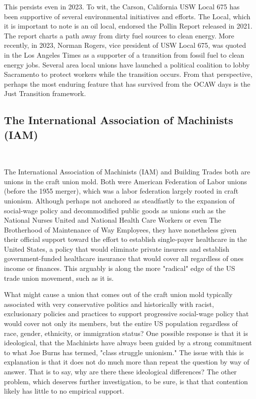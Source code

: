 \documentclass[12pt]{article}
\begin{document}
This persists even in 2023. To wit, the Carson, California USW Local 675 has been supportive of several environmental initiatives and efforts. The Local, which it is important to note is an oil local, endorsed the Pollin Report released in 2021. The report charts a path away from dirty fuel sources to clean energy. More recently, in 2023, Norman Rogers, vice president of USW Local 675, was quoted in the Los Angeles Times as a supporter of a transition from fossil fuel to clean energy jobs. Several area local unions have launched a political coalition to lobby Sacramento to protect workers while the transition occurs. From that perspective, perhaps the most enduring feature that has survived from the OCAW days is the Just Transition framework.

\subsection{The International Association of Machinists (IAM)} \

The International Association of Machinists (IAM) and Building Trades both are unions in the craft union mold. Both were American Federation of Labor unions (before the 1955 merger), which was a labor federation largely rooted in craft unionism. Although perhaps not anchored as steadfastly to the expansion of social-wage policy and decommodified public goods as unions such as the National Nurses United and National Health Care Workers or even The Brotherhood of Maintenance of Way Employees, they have nonetheless given their official support toward the effort to establish single-payer healthcare in the United States, a policy that would eliminate private insurers and establish government-funded healthcare insurance that would cover all regardless of ones income or finances. This arguably is along the more "radical" edge of the US trade union movement, such as it is.

What might cause a union that comes out of the craft union mold typically associated with very conservative politics and historically with racist, exclusionary policies and practices to support progressive social-wage policy that would cover not only its members, but the entire US population regardless of race, gender, ethnicity, or immigration status? One possible response is that it is ideological, that the Machinists have always been guided by a strong commitment to what Joe Burns has termed, "class struggle unionism." The issue with this is explanation is that it does not do much more than repeat the question by way of answer. That is to say, why are there these ideological differences? The other problem, which deserves further investigation, to be sure, is that that contention likely has little to no empirical support.
\end{document}
